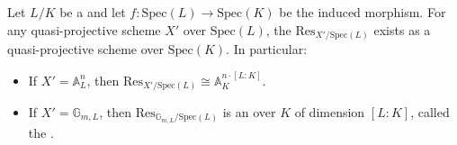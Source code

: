 \begin{theorem} \label{theorem:weil_restriction_over_finite_field_extension}
    Let $L/K$ be a  and let $f : \mathrm{Spec}(L) \to \mathrm{Spec}(K)$ be the induced morphism. For any quasi-projective scheme $X'$ over $\mathrm{Spec}(L)$, the  $\mathrm{Res}_{X'/\mathrm{Spec}(L)}$ exists as a quasi-projective scheme over $\mathrm{Spec}(K)$. In particular:
    \begin{itemize}
        \item If $X' = \mathbb{A}^n_L$, then $\mathrm{Res}_{X'/\mathrm{Spec}(L)} \cong \mathbb{A}^{n \cdot [L:K]}_K$.
        \item If $X' = \mathbb{G}_{m,L}$, then $\mathrm{Res}_{\mathbb{G}_{m,L}/\mathrm{Spec}(L)}$ is an  over $K$ of dimension $[L:K]$, called the .
    \end{itemize}
\end{theorem}
